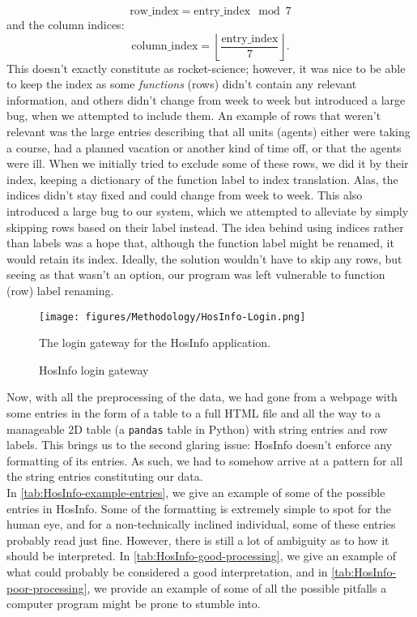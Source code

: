 \begin{equation*}
    \text{row\_index} = \text{entry\_index} \mod 7
\end{equation*}
and the column indices:
\begin{equation*}
    \text{column\_index} = \left\lfloor
        \frac{\text{entry\_index}}{7}
    \right\rfloor.
\end{equation*}
This doesn't exactly constitute as rocket-science; however, it was nice to be able to keep the index as some \emph{functions} (rows) didn't contain any relevant information, and others didn't change from week to week but introduced a large bug, when we attempted to include them. An example of rows that weren't relevant was the large entries describing that all units (agents) either were taking a course, had a planned vacation or another kind of time off, or that the agents were ill. When we initially tried to exclude some of these rows, we did it by their index, keeping a \gls{dictionary} of the function label to index translation. Alas, the indices didn't stay fixed and could change from week to week. This also introduced a large bug to our system, which we attempted to alleviate by simply skipping rows based on their label instead. The idea behind using indices rather than labels was a hope that, although the function label might be renamed, it would retain its index. Ideally, the solution wouldn't have to skip any rows, but seeing as that wasn't an option, our program was left vulnerable to function (row) label renaming.

\begin{figure}[H]
    \centering
    \texttt{[image: figures/Methodology/HosInfo-Login.png]}
    \caption{HosInfo login gateway}
    \small
    \raggedright 
    The login gateway for the HosInfo application.
    \label{fig:HosInfo-login}
\end{figure}

Now, with all the preprocessing of the data, we had gone from a webpage with some entries in the form of a table to a full HTML file and all the way to a manageable 2D table (a \texttt{pandas} table in Python) with string entries and row labels. This brings us to the second glaring issue: HosInfo doesn't enforce any formatting of its entries. As such, we had to somehow arrive at a pattern for all the string entries constituting our data.
\\
In \autoref{tab:HosInfo-example-entries}, we give an example of some of the possible entries in HosInfo. Some of the formatting is extremely simple to spot for the human eye, and for a non-technically inclined individual, some of these entries probably read just fine. However, there is still a lot of ambiguity as to how it should be interpreted. In \autoref{tab:HosInfo-good-processing}, we give an example of what could probably be considered a good interpretation, and in \autoref{tab:HosInfo-poor-processing}, we provide an example of some of all the possible pitfalls a computer program might be prone to stumble into.  

